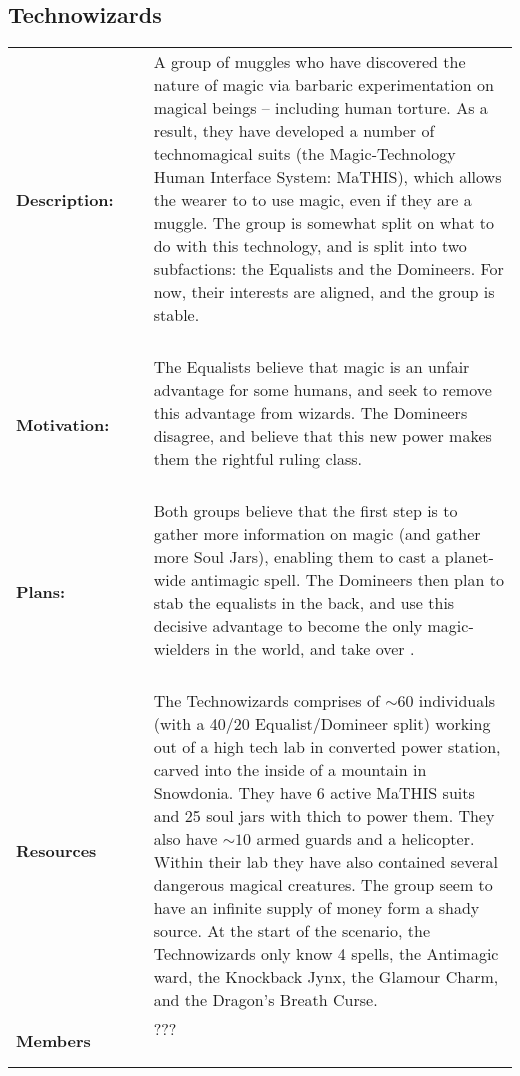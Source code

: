 \documentclass[oneside]{book}
\begin{document}
\subsection{Technowizards}
\begin{longtable}{p{} p{} p{} }

\bf Description: & ~ &\parbox[t]{\q cm}{A group of muggles who have discovered the nature of magic via barbaric experimentation on magical beings -- including human torture. As a result, they have developed a number of technomagical suits (the Magic-Technology Human Interface System: MaTHIS), which allows the wearer to to use magic, even if they are a muggle. The group is somewhat split on what to do with this technology, and is split into two subfactions: the Equalists and the Domineers. For now, their interests are aligned, and the group is stable. \\~  } 
\\
\bf Motivation:	& ~ & \parbox[t]{\q cm}{ The Equalists believe that magic is an unfair advantage for some humans, and seek to remove this advantage from wizards. The Domineers disagree, and believe that this new power makes them the rightful ruling class.\\~  } 
\\
\bf Plans:	& ~ & \parbox[t]{\q cm}{Both groups believe that the first step is to gather more information on magic (and gather more Soul Jars), enabling them to cast a planet-wide antimagic spell. The Domineers then plan to stab the equalists in the back, and use this decisive advantage to become the only magic-wielders in the world, and take over . \\~  } 
\\
\bf Resources & ~ & \parbox[t]{\q cm}{ The Technowizards comprises of $\sim 60$ individuals (with a 40/20 Equalist/Domineer split) working out of a high tech lab in converted power station, carved into the inside of a mountain in Snowdonia. They have 6 active MaTHIS suits and 25 soul jars with thich to power them. They also have $\sim 10$ armed guards and a helicopter. Within their lab they have also contained several dangerous magical creatures. The group seem to have an infinite supply of money form a shady source. At the start of the scenario, the Technowizards only know 4 spells, the Antimagic ward, the Knockback Jynx, the Glamour Charm, and the Dragon's Breath Curse.  \\ ~ }
\\
\bf Members	& ~ &  \parbox[t]{\q cm}{??? \\ ~ }

\end{longtable}
\end{document}
